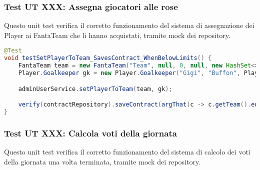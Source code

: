 \subsubsection{Test UT XXX: Assegna giocatori alle rose}

Questo unit test verifica il corretto funzionamento del sistema di assegnazione dei Player ai FantaTeam che li hanno acquistati,
tramite mock dei repository.

\begin{lstlisting}[language=Java]
@Test
void testSetPlayerToTeam_SavesContract_WhenBelowLimits() {
	FantaTeam team = new FantaTeam("Team", null, 0, null, new HashSet<>());
	Player.Goalkeeper gk = new Player.Goalkeeper("Gigi", "Buffon", Player.Club.JUVENTUS);

	adminUserService.setPlayerToTeam(team, gk);

	verify(contractRepository).saveContract(argThat(c -> c.getTeam().equals(team) && c.getPlayer().equals(gk)));
}
\end{lstlisting}


\subsubsection{Test UT XXX: Calcola voti della giornata}

Questo unit test verifica il corretto funzionamento del sistema di calcolo dei voti della giornata una volta terminata,
tramite mock dei repository.

